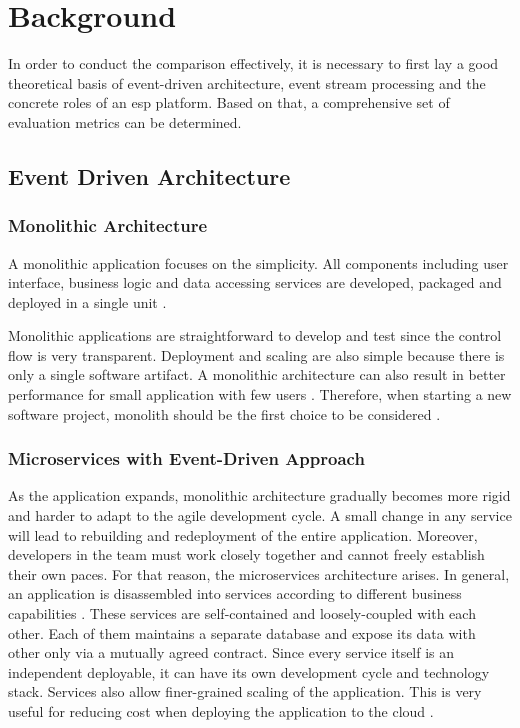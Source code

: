 \chapter{Background} \label{chap:background}
In order to conduct the comparison effectively, it is necessary to first lay a good theoretical basis of event-driven architecture, event stream processing and the concrete roles of an \acrshort{esp} platform. Based on that, a comprehensive set of evaluation metrics can be determined.


\section{Event Driven Architecture}
\subsection{Monolithic Architecture}
A monolithic application focuses on the simplicity. All components including user interface, business logic and data accessing services are developed, packaged and deployed in a single unit \cite{monolith}.

Monolithic applications are straightforward to develop and test since the control flow is very transparent. Deployment and scaling are also simple because there is only a single software artifact. A monolithic architecture can also result in better performance for small application with few users \cite{al2018comparative}. Therefore, when starting a new software project, monolith should be the first choice to be considered \cite{monolithfirst}. 

\subsection{Microservices with Event-Driven Approach} \label{section:eventdriven}
As the application expands, monolithic architecture gradually becomes more rigid and harder to adapt to the agile development cycle. A small change in any service will lead to rebuilding and redeployment of the entire application. Moreover, developers in the team must work closely together and cannot freely establish their own paces. For that reason, the microservices architecture arises. In general, an application is disassembled into services according to different business capabilities \cite{microservicesfowler}. These services are self-contained and loosely-coupled with each other. Each of them maintains a separate database and expose its data with other only via a mutually agreed contract. Since every service itself is an independent deployable, it can have its own development cycle and technology stack. Services also allow finer-grained scaling of the application. This is very useful for reducing cost when deploying the application to the cloud \cite{villamizar2016infrastructure}.

